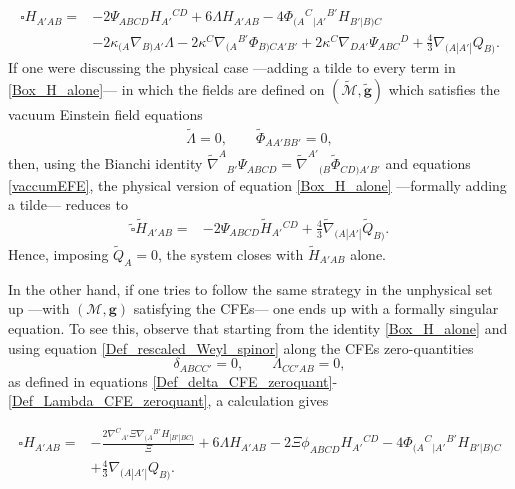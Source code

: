 \documentclass[10pt,a4paper]{article}
\theoremstyle{plain}
\def\bmg{{\bm g}}
\begin{document}
\begin{align}\label{Box_H_alone}
\square H_{A'AB} = & -2 \Psi _{ABCD} H_{A'}{}^{CD} + 6 \Lambda
H_{A'AB} -4 \Phi _{(A}{}^{C}{}_{|A'}{}^{B'}H_{B'|B)C} \nonumber \\ &
-2 \kappa _{(A}\nabla_{B)A'}\Lambda -2
\kappa^{C}\nabla_{(A}{}^{B'}\Phi _{B)CA'B'} + 2 \kappa ^{C}
\nabla_{DA'}\Psi _{ABC}{}^{D} + \tfrac{4}{3} \nabla_{(A|A'|}Q_{B)}.
\end{align}
If one were discussing the physical case ---adding a tilde to every
term in \eqref{Box_H_alone}--- in which the fields are defined on
$(\tilde{\mathcal{M}},\tilde{\bmg})$ which satisfies the vacuum
Einstein field equations
\begin{align}\label{vaccumEFE}
  \tilde{\Lambda}=0, \qquad \tilde{\Phi}_{AA'BB'}=0,
\end{align}
then, using the Bianchi identity $\tilde{\nabla}^{A}{}_{B'}\Psi
_{ABCD}=\tilde{\nabla}^{A'}{}_{(B}\tilde{\Phi}_{CD)A'B'}$ and
equations \eqref{vaccumEFE},
the physical version of equation \eqref{Box_H_alone} ---formally adding a tilde---
reduces to
\begin{align}\label{Box_H_alone_physical}
  \tilde{\square} \tilde{H}_{A'AB} = & -2 \Psi _{ABCD} \tilde{H}_{A'}{}^{CD}
  + \tfrac{4}{3} \tilde{\nabla}_{(A|A'|}\tilde{Q}_{B)}.
\end{align}
Hence, imposing $\tilde{Q}_A=0$, the system
closes with $\tilde{H}_{A'AB}$ alone.


\medskip

In the other hand, if one tries to follow the same strategy in the unphysical set up
---with $(\mathcal{M},\bmg)$ satisfying the CFEs--- one ends up with a
formally singular equation. To see this, observe that starting from
the identity \eqref{Box_H_alone} and using equation \eqref{Def_rescaled_Weyl_spinor}
along the CFEs zero-quantities
\[ \delta_{ABCC'}=0, \qquad \Lambda_{CC'AB}=0,\]
as defined in equations \eqref{Def_delta_CFE_zeroquant}-\eqref{Def_Lambda_CFE_zeroquant},
a calculation gives

\begin{align}\label{WaveH_twistor_singular}
  \square H_{A'AB} = & - \frac{2 \nabla^{C}{}_{A'}\Xi
    \nabla_{(A}{}^{B'}H_{|B'|BC)}}{\Xi } + 6 \Lambda H_{A'AB} -2 \Xi
  \phi _{ABCD}H_{A'}{}^{CD} -4
  \Phi_{(A}{}^{C}{}_{|A'}{}^{B'}H_{B'|B)C} \nonumber \\ & +
  \tfrac{4}{3} \nabla_{(A|A'|}Q_{B)}.
\end{align}
\end{document}
